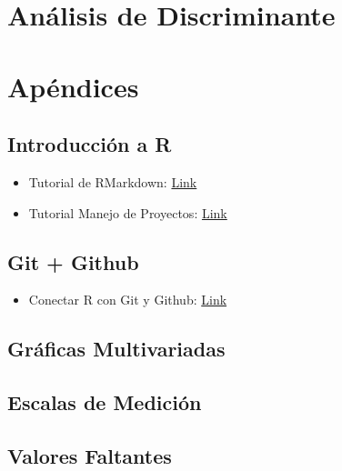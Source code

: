 \documentclass[
]{book}
\providecommand{\tightlist}{%
  \setlength{\itemsep}{0pt}\setlength{\parskip}{0pt}}
\begin{document}
\chapter{Análisis de Discriminante}\label{anuxe1lisis-de-discriminante}

\chapter{Apéndices}\label{apuxe9ndices}

\section{Introducción a R}\label{introducciuxf3n-a-r}

\begin{itemize}
\item
  Tutorial de RMarkdown: \href{https://github.com/HaydeePeruyero/Rmarkdown_and_LaTeX/blob/main/ejemplo.Rmd}{Link}
\item
  Tutorial Manejo de Proyectos: \href{https://haydeeperuyero.github.io/Seminario_Estadistica/manejo-de-proyectos.html}{Link}
\end{itemize}

\section{Git + Github}\label{git-github}

\begin{itemize}
\tightlist
\item
  Conectar R con Git y Github: \href{https://r-ladies-morelia.github.io/blog/conectar/}{Link}
\end{itemize}

\section{Gráficas Multivariadas}\label{gruxe1ficas-multivariadas}

\section{Escalas de Medición}\label{escalas-de-mediciuxf3n}

\section{Valores Faltantes}\label{valores-faltantes}

  
\end{document}
